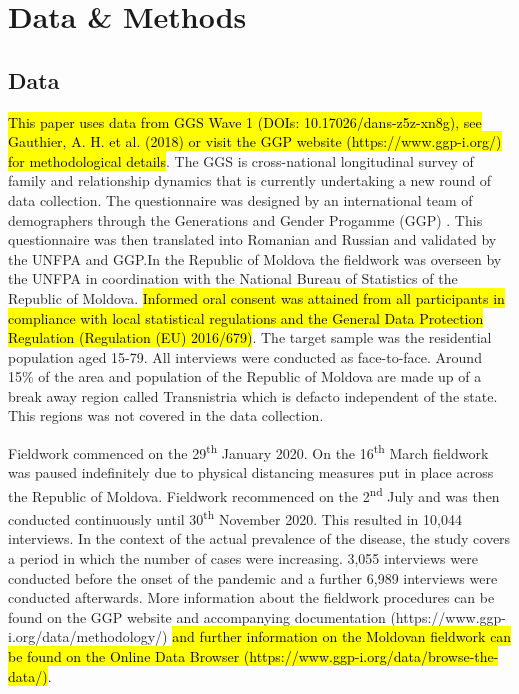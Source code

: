 \documentclass[10pt,letterpaper]{article}
\begin{document}
\section*{Data \& Methods} \label{sec:data}
\subsection*{Data}
\hl{This paper uses data from GGS Wave 1 (DOIs: 10.17026/dans-z5z-xn8g), see Gauthier, A. H. et al. (2018) or visit the GGP website (https://www.ggp-i.org/) for methodological details}. The GGS is cross-national longitudinal survey of family and relationship dynamics that is currently undertaking a new round of data collection. The questionnaire was designed by an international team of demographers through the Generations and Gender Progamme (GGP) \cite{vikat2007generations}. This questionnaire was then translated into Romanian and Russian and validated by the UNFPA and GGP.In the Republic of Moldova the fieldwork was overseen by the UNFPA in coordination with the National Bureau of Statistics of the Republic of Moldova. \hl{Informed oral consent was attained from all participants in compliance with local statistical regulations and the General Data Protection Regulation (Regulation (EU) 2016/679)}. The target sample was the residential population aged 15-79. All interviews were conducted as face-to-face. Around 15\% of the area and population of the Republic of Moldova are made up of a break away region called Transnistria which is defacto independent of the state. This regions was not covered in the data collection.  

Fieldwork commenced on the 29\textsuperscript{th} January 2020. On the 16\textsuperscript{th} March fieldwork was paused indefinitely due to physical distancing measures put in place across the Republic of Moldova. Fieldwork recommenced on the 2\textsuperscript{nd} July and was then conducted continuously until 30\textsuperscript{th} November 2020.  This resulted in 10,044 interviews. In the context of the actual prevalence of the disease, the study covers a period in which the number of cases were increasing.  3,055 interviews were conducted before the onset of the pandemic and a further 6,989 interviews were conducted afterwards. More information about the fieldwork procedures can be found on the GGP website and accompanying documentation (https://www.ggp-i.org/data/methodology/) \hl{and further information on the Moldovan fieldwork can be found on the Online Data Browser (https://www.ggp-i.org/data/browse-the-data/)}.
\end{document}
